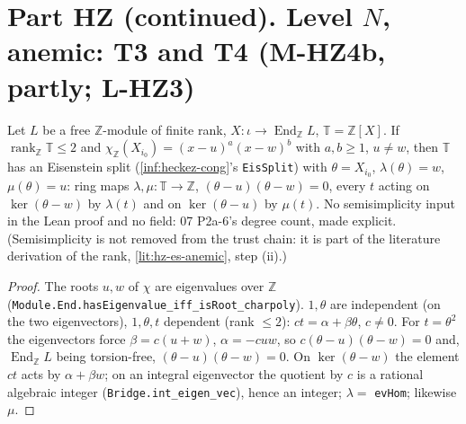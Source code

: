 \chapter{Part HZ (continued). Level $N$, anemic: T3 and T4 (M-HZ4b, partly; L-HZ3)}

\begin{theorem}\label{inf:hz-bridge-rank2}
  \leanok
  Let $L$ be a free $\mathbb Z$-module of finite rank, $X:\iota\to\operatorname{End}_{\mathbb Z}L$, $\mathbb T=\mathbb Z[X]$. If
  $\operatorname{rank}_{\mathbb Z}\mathbb T\le2$ and $\chi_{\mathbb Z}(X_{i_0})=(x-u)^a(x-w)^b$ with $a,b\ge1$, $u\ne w$, then $\mathbb T$ has an
  Eisenstein split (\ref{inf:heckez-cong}'s \texttt{EisSplit}) with $\theta=X_{i_0}$, $\lambda(\theta)=w$, $\mu(\theta)=u$: ring maps
  $\lambda,\mu:\mathbb T\to\mathbb Z$, $(\theta-u)(\theta-w)=0$, every $t$ acting on $\ker(\theta-w)$ by $\lambda(t)$ and on $\ker(\theta-u)$ by
  $\mu(t)$. No semisimplicity input in the Lean proof and no field: 07 P2a-6's degree count, made explicit. (Semisimplicity is not
  removed from the trust chain: it is part of the literature derivation of the rank, \ref{lit:hz-es-anemic}, step (ii).)
\end{theorem}
\begin{proof}
  \leanok
  The roots $u,w$ of $\chi$ are eigenvalues over $\mathbb Z$ (\texttt{Module.End.hasEigenvalue\_iff\_isRoot\_charpoly}). $1,\theta$ are
  independent (on the two eigenvectors), $1,\theta,t$ dependent (rank $\le2$): $ct=\alpha+\beta\theta$, $c\ne0$. For $t=\theta^2$ the eigenvectors
  force $\beta=c(u+w)$, $\alpha=-cuw$, so $c(\theta-u)(\theta-w)=0$ and, $\operatorname{End}_{\mathbb Z}L$ being torsion-free,
  $(\theta-u)(\theta-w)=0$. On $\ker(\theta-w)$ the element $ct$ acts by $\alpha+\beta w$; on an integral eigenvector the quotient by $c$ is a
  rational algebraic integer (\texttt{Bridge.int\_eigen\_vec}), hence an integer; $\lambda=$ \texttt{evHom}; likewise $\mu$.
\end{proof}

